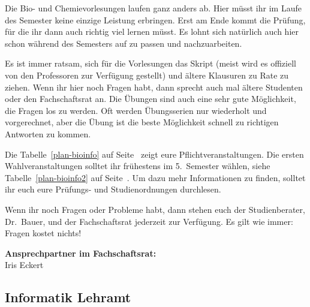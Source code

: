 Die Bio- und Chemievorlesungen laufen ganz anders ab.
Hier müsst ihr im Laufe des Semester keine einzige Leistung erbringen.
Erst am Ende kommt die Prüfung, für die ihr dann auch richtig viel lernen müsst.
Es lohnt sich natürlich auch hier schon während des Semesters auf zu passen und nachzuarbeiten.

Es ist immer ratsam, sich für die Vorlesungen das Skript (meist wird es offiziell von den Professoren zur Verfügung gestellt) und ältere Klausuren zu Rate zu ziehen.
Wenn ihr hier noch Fragen habt, dann sprecht auch mal ältere Studenten oder den Fachschaftsrat an.
Die Übungen sind auch eine sehr gute Möglichkeit, die Fragen los zu werden.
Oft werden Übungsserien nur wiederholt und vorgerechnet, aber die Übung ist die beste Möglichkeit schnell zu richtigen Antworten zu kommen.

Die Tabelle~\ref{plan-bioinfo} auf Seite~\pageref{plan-bioinfo} zeigt eure Pflichtveranstaltungen.
Die ersten Wahlveranstaltungen solltet ihr frühestens im 5.~Semester wählen, siehe Tabelle~\ref{plan-bioinfo2} auf Seite~\pageref{plan-bioinfo2}.
Um dazu mehr Informationen zu finden, solltet ihr euch eure Prüfungs- und Studienordnungen durchlesen.

Wenn ihr noch Fragen oder Probleme habt, dann stehen euch der Studienberater, Dr.~Bauer, und der Fachschaftsrat jederzeit zur Verfügung.
Es gilt wie immer: Fragen kostet nichts!

\textbf{Ansprechpartner im Fachschaftsrat:}\\
Iris Eckert\\



\subsection{Informatik Lehramt}
\label{studiengang_infolehramt}

